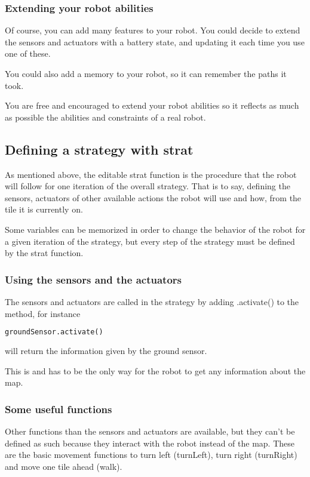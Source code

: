 \documentclass[a4paper,11pt]{article}
\begin{document}
\subsubsection{Extending your robot abilities}

Of course, you can add many features to your robot. You could decide
to extend the sensors and actuators with a battery state, and updating
it each time you use one of these.

You could also add a memory to your robot, so it can remember the
paths it took.

You are free and encouraged to extend your robot abilities so it
reflects as much as possible the abilities and constraints of a real
robot.

\subsection{Defining a strategy with strat}
As mentioned above, the editable strat function is the procedure 
that the robot will follow for one iteration of the overall strategy.
That is to say, defining the sensors, actuators of other available actions 
the robot will use and how, from the tile it is currently on.

Some variables can be memorized in order to change the behavior of the robot for a given iteration 
of the strategy, but every step of the strategy must be defined by the strat function.

\subsubsection{Using the sensors and the actuators}
The sensors and actuators are called in the strategy by adding .activate() to the method,
for instance 
\begin{lstlisting}[language=Python]
  groundSensor.activate() 
\end{lstlisting}
will return the information given by the ground sensor.

This is and has to be the only way for the robot to get any information about the map.

\subsubsection{Some useful functions}
Other functions than the sensors and actuators are available, but they can't be defined as such
because they interact with the robot instead of the map. These are the basic movement functions
to turn left (turnLeft), turn right (turnRight) and move one tile ahead (walk). 
\end{document}
